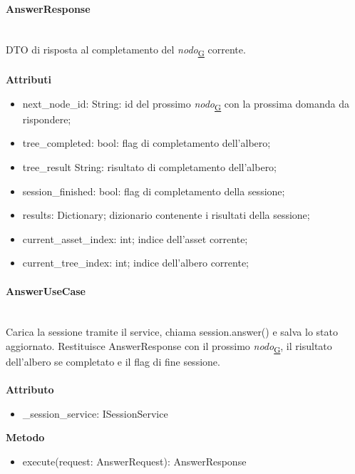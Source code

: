 \documentclass[a4paper,12pt]{article}
\begin{document}
                \paragraph{AnswerResponse}\mbox{}\\
                    DTO di risposta al completamento del \textit{nodo}\textsubscript{\href{https://atlasteam9.github.io/Atlas/glossario.html\#Nodo}{G}} corrente.\\\\
                    \textbf{Attributi}
                    \begin{itemize}
                        \item {\ttfamily next\_node\_id: String}: id del prossimo \textit{nodo}\textsubscript{\href{https://atlasteam9.github.io/Atlas/glossario.html\#Nodo}{G}} con la prossima domanda da rispondere;
                        \item {\ttfamily tree\_completed: bool}: flag di completamento dell'albero;
                        \item {\ttfamily tree\_result String}: risultato di completamento dell'albero;
                        \item {\ttfamily session\_finished: bool}: flag di completamento della sessione;
                        \item {\ttfamily results: Dictionary}; dizionario contenente i risultati della sessione;
                        \item {\ttfamily current\_asset\_index: int}; indice dell'asset corrente;
                        \item {\ttfamily current\_tree\_index: int}; indice dell'albero corrente;
                    \end{itemize}

                \paragraph{AnswerUseCase}\mbox{}\\
                    Carica la sessione tramite il service, chiama {\ttfamily session.answer()} e salva lo stato aggiornato. Restituisce {\ttfamily AnswerResponse} con il prossimo \textit{nodo}\textsubscript{\href{https://atlasteam9.github.io/Atlas/glossario.html\#Nodo}{G}}, il risultato dell'albero se completato e il flag di fine sessione.\\\\
                    \textbf{Attributo}
                    \begin{itemize}
                        \item {\ttfamily \_session\_service: ISessionService}
                    \end{itemize}
                    \textbf{Metodo}
                    \begin{itemize}
                        \item {\ttfamily execute(request: AnswerRequest): AnswerResponse}
                    \end{itemize}
\end{document}
